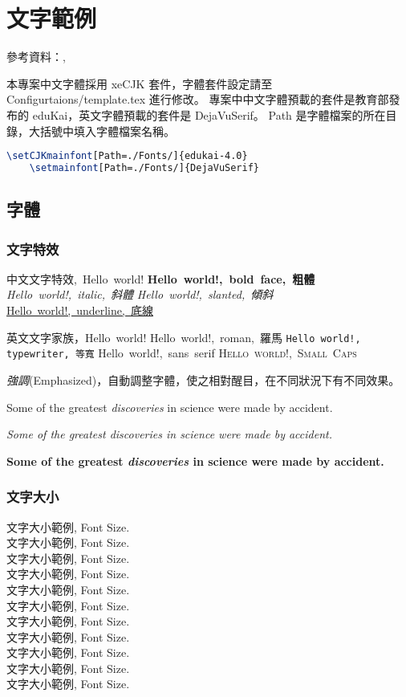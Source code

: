 \chapter{文字範例} \label{ch_content}
參考資料：\cite{latex_basic}, \cite{latex_fbox}

本專案中文字體採用 xeCJK 套件，字體套件設定請至 Configurtaions/template.tex 進行修改。
專案中中文字體預載的套件是教育部發布的 eduKai，英文字體預載的套件是 DejaVuSerif。
Path 是字體檔案的所在目錄，大括號中填入字體檔案名稱。
\begin{lstlisting}[language=TeX]
    \setCJKmainfont[Path=./Fonts/]{edukai-4.0}
    \setmainfont[Path=./Fonts/]{DejaVuSerif}
\end{lstlisting}

\section{字體}
\subsection{文字特效}
\hbox{中文文字特效, Hello world!}
{\LARGE
\hbox{\textbf{Hello world!, bold face, 粗體}}
\hbox{\textit{Hello world!, italic, 斜體}}
\hbox{\textsl{Hello world!, slanted, 傾斜}}
\hbox{\underline{Hello world!, underline, 底線}}
}

\hbox{英文文字家族，Hello world!}
{\LARGE
\hbox{\textrm{Hello world!, roman, 羅馬}}
\hbox{\texttt{Hello world!, typewriter, 等寬}}
\hbox{\textsf{Hello world!, sans serif}}
\hbox{\textsc{Hello world!, Small Caps}}
}

\emph{強調}(Emphasized)，自動調整字體，使之相對醒目，在不同狀況下有不同效果。

Some of the greatest \emph{discoveries} 
in science 
were made by accident.

\textit{Some of the greatest \emph{discoveries} 
in science 
were made by accident.}

\textbf{Some of the greatest \emph{discoveries} 
in science 
were made by accident.}

\subsection{文字大小}
文字大小範例, Font Size.\\
{\tiny 文字大小範例, Font Size.}\\
{\scriptsize 文字大小範例, Font Size.}\\
{\footnotesize 文字大小範例, Font Size.}\\
{\small 文字大小範例, Font Size.}\\
{\normalsize 文字大小範例, Font Size.}\\
{\large 文字大小範例, Font Size.}\\
{\Large 文字大小範例, Font Size.}\\
{\LARGE 文字大小範例, Font Size.}\\
{\huge 文字大小範例, Font Size.} \\
{\Huge 文字大小範例, Font Size.}

